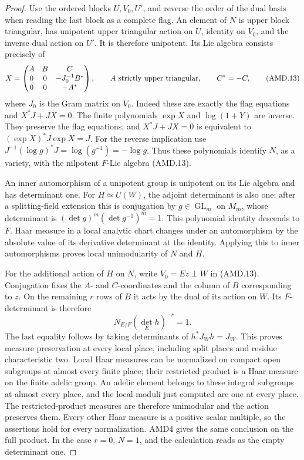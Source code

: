 \documentclass[11pt,a4paper]{article}
\numberwithin{equation}{section}
\theoremstyle{remark}\newtheorem{remark}[theorem]{Remark}
\begin{document}
\begin{proof}
Use the ordered blocks \(U,V_0,U'\), and reverse the order
of the dual basis when reading the last block as a complete
flag.  An element of \(N\) is upper block triangular, has
unipotent upper triangular action on \(U\), identity on
\(V_0\), and the inverse dual action on \(U'\).  It is
therefore unipotent.  Its Lie algebra consists precisely of
\[
 X=\begin{pmatrix}
 A&B&C\\0&0&-J_0^{-1}B^*\\0&0&-A^*
 \end{pmatrix},
 \qquad A\hbox{ strictly upper triangular},\qquad C^*=-C,
 \tag{AMD.13}
\]
where \(J_0\) is the Gram matrix on \(V_0\).  Indeed these
are exactly the flag equations and \(X^*J+JX=0\).
The finite polynomials \(\exp X\) and \(\log(1+Y)\) are
inverse.  They preserve the flag equations, and
\(X^*J+JX=0\) is equivalent to \((\exp X)^*J\exp X=J\).
For the reverse implication use
\(J^{-1}(\log g)^*J=\log(g^{-1})=-\log g\).
Thus these polynomials identify \(N\), as a variety, with
the nilpotent \(F\)-Lie algebra (AMD.13).

An inner automorphism of a unipotent group is unipotent on its
Lie algebra and has determinant one.  For \(H\simeq U(W)\),
the adjoint determinant is also one: after a splitting-field
extension this is conjugation by \(g\in\operatorname{GL}_m\)
on \(M_m\), whose determinant is
\((\det g)^m(\det g^{-1})^m=1\).  This polynomial identity
descends to \(F\).  Haar measure in a local analytic chart
changes under an automorphism by the absolute value of its
derivative determinant at the identity.  Applying this to inner
automorphisms proves local unimodularity of \(N\) and \(H\).

For the additional action of \(H\) on \(N\), write
\(V_0=Ez\perp W\) in (AMD.13).  Conjugation fixes the
\(A\)- and \(C\)-coordinates and the column of \(B\)
corresponding to \(z\).  On the remaining \(r\) rows of
\(B\) it acts by the dual of its action on \(W\).  Its
\(F\)-determinant is therefore
\[
       N_{E/F}(\det_E h)^{-r}=1.
 \tag{AMD.14}
\]
The last equality follows by taking determinants of
\(h^*J_Wh=J_W\).  This proves measure preservation at every
local place, including split places and residue characteristic
two.  Local Haar measures can be normalized on compact open
subgroups at almost every finite place; their restricted product
is a Haar measure on the finite adelic group.  An adelic element
belongs to these integral subgroups at almost every place, and
the local moduli just computed are one at every place.  The
restricted-product measures are therefore unimodular and the
action preserves them.  Every other Haar measure is a positive
scalar multiple, so the assertions hold for every normalization.
AMD4 gives the same conclusion on the full product.  In the
case \(r=0\), \(N=1\), and the calculation reads as the
empty determinant one.
\end{proof}
\end{document}
